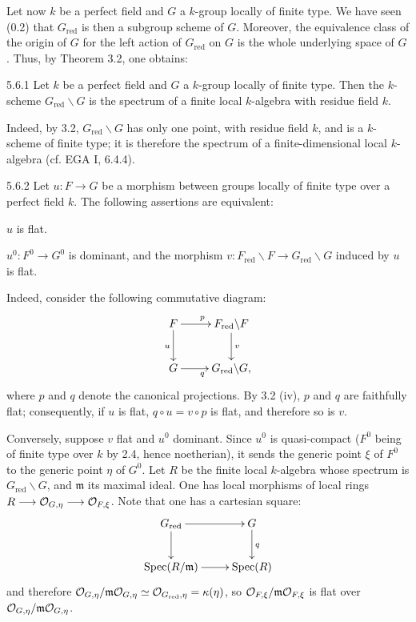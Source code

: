 Let now $k$ be a perfect field and $G$ a $k$-group locally of finite type. We have seen (0.2) that $G_{\mathrm{red}}$ is then a subgroup scheme of $G$. Moreover, the equivalence class of the origin of $G$ for the left action of $G_{\mathrm{red}}$ on $G$ is the whole underlying space of $G$. Thus, by Theorem 3.2, one obtains:
\begin{proposition}{5.6.1}\label{VIA.5.6.1}
Let $k$ be a perfect field and $G$ a $k$-group locally of finite type. Then the $k$-scheme $G_{\mathrm{red}}\backslash G$ is the spectrum of a finite local $k$-algebra with residue field $k$.
\end{proposition}
Indeed, by 3.2, $G_{\mathrm{red}}\backslash G$ has only one point, with residue field $k$, and is a $k$-scheme of finite type; it is therefore the spectrum of a finite-dimensional local $k$-algebra (cf. EGA I, 6.4.4).
\begin{proposition}{5.6.2}\label{VIA.5.6.2}
Let $u:F\to G$ be a morphism between groups locally of finite type over a perfect field $k$. The following assertions are equivalent:
\begin{enumeratei}
\item $u$ is flat.
\item $u^0:F^0\to G^0$ is dominant, and the morphism $v:F_{\mathrm{red}}\backslash F\to G_{\mathrm{red}}\backslash G$ induced by $u$ is flat.
\end{enumeratei}
\end{proposition}
Indeed, consider the following commutative diagram:
\[
\xymatrix{F\ar[r]^p\ar[d]_u&F_{\mathrm{red}}\backslash F\ar[d]^v\\G\ar[r]_q&G_{\mathrm{red}}\backslash G,}
\]
where $p$ and $q$ denote the canonical projections. By 3.2 (iv), $p$ and $q$ are faithfully flat; consequently, if $u$ is flat, $q\circ u=v\circ p$ is flat, and therefore so is $v$.

Conversely, suppose $v$ flat and $u^0$ dominant. Since $u^0$ is quasi-compact ($F^0$ being of finite type over $k$ by 2.4, hence noetherian), it sends the generic point $\xi$ of $F^0$ to the generic point $\eta$ of $G^0$. Let $R$ be the finite local $k$-algebra whose spectrum is $G_{\mathrm{red}}\backslash G$, and $\mathfrak m$ its maximal ideal. One has local morphisms of local rings $R\longrightarrow\mathcal{O}_{G,\eta}\longrightarrow\mathcal{O}_{F,\xi}$. Note that one has a cartesian square:
\[
\xymatrix{G_{\mathrm{red}}\ar[r]\ar[d]&G\ar[d]^q\\\Spec(R/\mathfrak m)\ar[r]&\Spec(R)}
\]
and therefore $\mathcal{O}_{G,\eta}/\mathfrak m\mathcal{O}_{G,\eta}\simeq\mathcal{O}_{G_{\mathrm{red}},\eta}=\kappa(\eta)$, so $\mathcal{O}_{F,\xi}/\mathfrak m\mathcal{O}_{F,\xi}$ is flat over $\mathcal{O}_{G,\eta}/\mathfrak m\mathcal{O}_{G,\eta}$.

